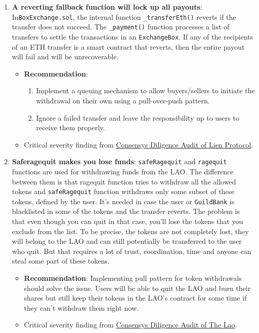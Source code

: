 \begin{enumerate}
\item\textbf{A reverting fallback function will lock up all payouts}: In\linebreak\verb|BoxExchange.sol|, the internal function \verb|_transferEth()| reverts if the transfer does not succeed. The \verb|_payment()| function processes a list of transfers to settle the transactions in an \verb|ExchangeBox|. If any of the recipients of an ETH transfer is a smart contract that reverts, then the entire payout will fail and will be unrecoverable.
	\begin{itemize}
	\item\textbf{Recommendation}:
	    \begin{enumerate}
	    \item Implement a queuing mechanism to allow buyers/sellers to initiate the withdrawal on their own using a pull-over-push pattern.
	    \item Ignore a failed transfer and leave the responsibility up to users to receive them properly.
	    \end{enumerate}
	\item Critical severity finding from \href{https://consensys.net/diligence/audits/2020/05/lien-protocol/\#a-reverting-fallback-function-will-lock-up-all-payouts}{Consensys Diligence Audit of Lien Protocol}.
	\end{itemize}

\item\textbf{Saferagequit makes you lose funds}: \verb|safeRagequit| and \verb|ragequit| functions are used for withdrawing funds from the LAO. The difference between them is that ragequit function tries to withdraw all the allowed tokens and \verb|safeRagequit| function withdraws only some subset of these tokens, defined by the user. It’s needed in case the user or \verb|GuildBank| is blacklisted in some of the tokens and the transfer reverts. The problem is that even though you can quit in that case, you’ll lose the tokens that you exclude from the list. To be precise, the tokens are not completely lost, they will belong to the LAO and can still potentially be transferred to the user who quit. But that requires a lot of trust, coordination, time and anyone can steal some part of these tokens.
	\begin{itemize}
	\item\textbf{Recommendation}: Implementing pull pattern for token withdrawals should solve the issue. Users will be able to quit the LAO and burn their shares but still keep their tokens in the LAO’s contract for some time if they can’t withdraw them right now.
	\item Critical severity finding from \href{https://consensys.net/diligence/audits/2020/01/the-lao}{Consensys Diligence Audit of The Lao}.
	\end{itemize}


\end{enumerate}
